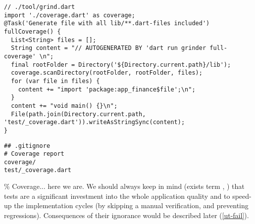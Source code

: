 \begin{lstlisting}
// ./tool/grind.dart
import './coverage.dart' as coverage;
@Task('Generate file with all lib/**.dart-files included')
fullCoverage() {
  List<String> files = [];
  String content = "// AUTOGENERATED BY 'dart run grinder full-coverage' \n";
  final rootFolder = Directory('${Directory.current.path}/lib');
  coverage.scanDirectory(rootFolder, rootFolder, files);
  for (var file in files) {
    content += "import 'package:app_finance$file';\n";
  }
  content += "void main() {}\n";
  File(path.join(Directory.current.path, 'test/_coverage.dart')).writeAsStringSync(content);
}
\end{lstlisting}

\begin{lstlisting}[language=terminal]
## .gitignore
# Coverage report
coverage/
test/_coverage.dart
\end{lstlisting}

\% Coverage... here we are. We should always keep in mind (exists term , \cite{Bjorn21})
that tests are a significant investment into the whole application quality and to speed-up the implementation cycles
(by skipping a manual verification, and preventing regressions). Consequences of their ignorance would be described
later (\ref{ut-fail}).
